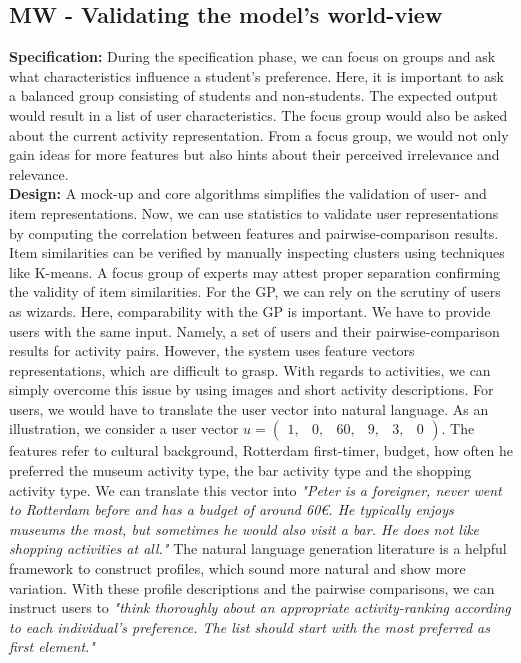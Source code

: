 \documentclass[11pt,a4paper,oneside]{article}
\begin{document}
\subsection{MW - Validating the model's world-view}
\textbf{Specification:} During the specification phase, we can focus on groups and ask what characteristics influence a student's preference.\cite{CITE} Here, it is important to ask a balanced group consisting of students and non-students. The expected output would result in a list of user characteristics. The focus group would also be asked about the current activity representation. From a focus group, we would not only gain ideas for more features but also hints about their perceived irrelevance and relevance.\\
\textbf{Design:} A mock-up and core algorithms simplifies the validation of user- and item representations. Now, we can use statistics to validate user representations by computing the correlation between features and pairwise-comparison results. Item similarities can be verified by manually inspecting clusters using techniques like K-means. A focus group of experts may attest proper separation confirming the validity of item similarities. For the GP, we can rely on the scrutiny of users as wizards.\cite{CITE} Here, comparability with the GP is important. We have to provide users with the same input. Namely, a set of users and their pairwise-comparison results for activity pairs. However, the system uses feature vectors representations, which are difficult to grasp. With regards to activities, we can simply overcome this issue by using images and short activity descriptions. For users, we would have to translate the user vector into natural language. As an illustration, we consider a user vector $u = \left(\begin{smallmatrix} 1, & 0, & 60, & 9, & 3, & 0 \end{smallmatrix}\right)$. The features refer to cultural background, Rotterdam first-timer, budget, how often he preferred the museum activity type, the bar activity type and the shopping activity type. We can translate this vector into \emph{"Peter is a foreigner, never went to Rotterdam before and has a budget of around 60€. He typically enjoys museums the most, but sometimes he would also visit a bar. He does not like shopping activities at all."} The natural language generation literature is a helpful framework to construct profiles, which sound more natural and show more variation.\cite{CITE} With these profile descriptions and the pairwise comparisons, we can instruct users to \emph{"think thoroughly about an appropriate activity-ranking according to each individual's preference. The list should start with the most preferred as first element."}\\
\end{document}
